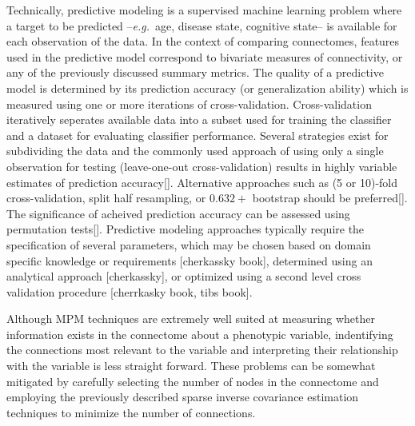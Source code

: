 \documentclass[5p]{elsarticle}
\begin{document}
Technically, predictive modeling is a supervised machine learning problem
where a target to be predicted --\emph{e.g.}\ age, disease state,
cognitive state-- is available for each observation of the data. In the
context of comparing connectomes, features used in the predictive model
correspond to bivariate measures of connectivity, or any of the previously
discussed summary metrics.  
%
The quality of a predictive model is determined by its prediction accuracy (or
generalization ability) which is measured using one or more iterations of
cross-validation. Cross-validation iteratively seperates available data into
a subset used for training the classifier and a dataset for evaluating
classifier performance. Several strategies exist for subdividing the data and
the commonly used approach of using only a single observation for testing
(leave-one-out cross-validation) results in highly variable estimates of
prediction accuracy[]. Alternative approaches such as (5 or 10)-fold
cross-validation, split half resampling, or $0.632+$ bootstrap should be
preferred[]. The significance of acheived prediction accuracy can be assessed
using permutation tests[]. Predictive modeling approaches typically require the
specification of several parameters, which may be chosen based on domain
specific knowledge or requirements [cherkassky book], determined using an
analytical approach [cherkassky], or optimized using a second level cross
validation procedure [cherrkasky book, tibs book].  

Although MPM techniques are extremely well suited at measuring whether
information exists in the connectome about a phenotypic variable, indentifying the
connections most relevant to the variable and interpreting their relationship
with the variable is less straight forward. These problems can be somewhat mitigated by
carefully selecting the number of
nodes in the connectome and employing the previously described sparse inverse covariance estimation
techniques to minimize the number of connections. 
\end{document}
